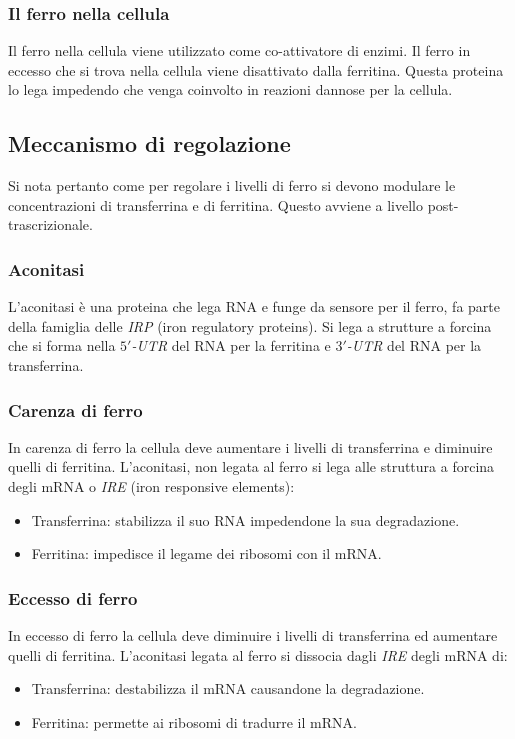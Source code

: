 	\subsubsection{Il ferro nella cellula}
	Il ferro nella cellula viene utilizzato come co-attivatore di enzimi.
	Il ferro in eccesso che si trova nella cellula viene disattivato dalla ferritina.
	Questa proteina lo lega impedendo che venga coinvolto in reazioni dannose per la cellula.


	\subsection{Meccanismo di regolazione}
	Si nota pertanto come per regolare i livelli di ferro si devono modulare le concentrazioni di transferrina e di ferritina.
	Questo avviene a livello post-trascrizionale.

		\subsubsection{Aconitasi}
		L'aconitasi \`e una proteina che lega RNA e funge da sensore per il ferro, fa parte della famiglia delle \emph{IRP} (iron regulatory proteins).
		Si lega a strutture a forcina che si forma nella \emph{$5'$-UTR} del RNA per la ferritina e \emph{$3'$-UTR} del RNA per la transferrina.

		\subsubsection{Carenza di ferro}
		In carenza di ferro la cellula deve aumentare i livelli di transferrina e diminuire quelli di ferritina.
		L'aconitasi, non legata al ferro si lega alle struttura a forcina degli mRNA o \emph{IRE} (iron responsive elements):
		\begin{itemize}
			\item Transferrina: stabilizza il suo RNA impedendone la sua degradazione.
			\item Ferritina: impedisce il legame dei ribosomi con il mRNA.
		\end{itemize}

		\subsubsection{Eccesso di ferro}
		In eccesso di ferro la cellula deve diminuire i livelli di transferrina ed aumentare quelli di ferritina.
		L'aconitasi legata al ferro si dissocia dagli \emph{IRE} degli mRNA di:
		\begin{itemize}
			\item Transferrina: destabilizza il mRNA causandone la degradazione.
			\item Ferritina: permette ai ribosomi di tradurre il mRNA.
		\end{itemize}
	
